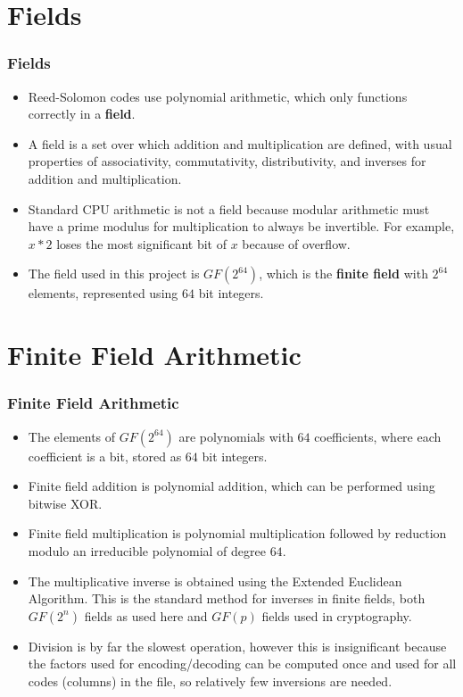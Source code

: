 \documentclass{beamer}
\begin{document}
\section{Fields}
\begin{frame}
\frametitle{Fields}
\begin{itemize}

\item
Reed-Solomon codes use polynomial arithmetic, which only functions correctly in a \textbf{field}.

\item
A field is a set over which addition and multiplication are defined, with usual properties of associativity, commutativity, distributivity, and inverses for addition and multiplication.

\item
Standard CPU arithmetic is not a field because modular arithmetic must have a prime modulus for multiplication to always be invertible. For example, $x * 2$ loses the most significant bit of $x$ because of overflow.

\item
The field used in this project is $GF(2^{64})$, which is the \textbf{finite field} with $2^{64}$ elements, represented using $64$ bit integers.

\end{itemize}
\end{frame}

\section{Finite Field Arithmetic}
\begin{frame}
\frametitle{Finite Field Arithmetic}
\begin{itemize}

\item
The elements of $GF(2^{64})$ are polynomials with $64$ coefficients, where each coefficient is a bit, stored as $64$ bit integers.

\item
Finite field addition is polynomial addition, which can be performed using bitwise XOR.

\item
Finite field multiplication is polynomial multiplication followed by reduction modulo an irreducible polynomial of degree $64$.

\item
The multiplicative inverse is obtained using the Extended Euclidean Algorithm.
This is the standard method for inverses in finite fields, both $GF(2^n)$ fields as used here and $GF(p)$ fields used in cryptography.

\item 
Division is by far the slowest operation,
however this is insignificant because the factors used for encoding/decoding can be computed once and used for all codes (columns) in the file, so relatively few inversions are needed.

\end{itemize}
\end{frame}
\end{document}
